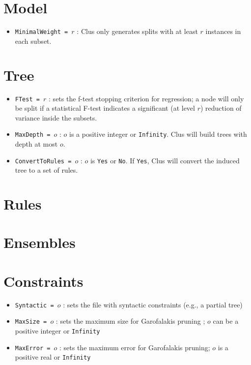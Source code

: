 \documentclass[a4paper]{report}
\begin{document}
\section{Model}

\begin{itemize}
\item {\tt MinimalWeight = $r$} : Clus only generates splits with at least $r$ instances in each subset.
\end{itemize}

\section{Tree}

\begin{itemize}
\item {\tt FTest = $r$} : sets the f-test stopping criterion for regression; a node will only be split if a statistical F-test indicates a significant (at level $r$) reduction of variance inside the subsets.
\item {\tt MaxDepth = $o$} : $o$ is a positive integer or {\tt Infinity}.  Clus will build trees with depth at  most $o$.
\item {\tt ConvertToRules = $o$} : $o$ is {\tt Yes} or {\tt No}.  If {\tt Yes},  Clus will convert the induced tree to a set of rules.
\end{itemize}

\section{Rules}


\section{Ensembles}

\section{Constraints}

\begin{itemize}
\item {\tt Syntactic = $o$} : sets the file with syntactic constraints (e.g., a partial tree) \cite{paper-on-constraints}
\item {\tt MaxSize = $o$} : sets the maximum size for Garofalakis pruning \cite{Garofalakis}; $o$ can be a positive integer or {\tt Infinity}
\item {\tt MaxError = $o$} : sets the maximum error for Garofalakis pruning; $o$ is a positive real or {\tt Infinity}
\end{itemize}
\end{document}
